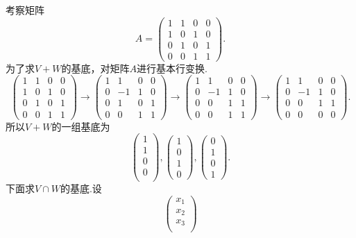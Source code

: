 ﻿\documentclass{book} \usepackage{exsheets} \usepackage{xeCJK}
\begin{document}
\begin{solution}
  考察矩阵
$$
A=
\begin{pmatrix}
  1&1&0&0\\
  1&0&1&0\\
  0&1&0&1\\
  0&0&1&1
\end{pmatrix}.
$$
为了求$V+W$的基底，对矩阵$A$进行基本行变换.
$$
  \begin{pmatrix}
    1&1&0&0\\
    1&0&1&0\\
    0&1&0&1\\
    0&0&1&1
  \end{pmatrix}\to
  \begin{pmatrix}
    1&1&0&0\\
    0&-1&1&0\\
    0&1&0&1\\
    0&0&1&1
  \end{pmatrix}\to
  \begin{pmatrix}
    1&1&0&0\\
    0&-1&1&0\\
    0&0&1&1\\
    0&0&1&1
  \end{pmatrix}\to
  \begin{pmatrix}
    1&1&0&0\\
    0&-1&1&0\\
    0&0&1&1\\
    0&0&0&0
  \end{pmatrix}.
$$
所以$V+W$的一组基底为
$$
\begin{pmatrix}
  1\\
  1\\
  0\\
  0\\
\end{pmatrix},
\begin{pmatrix}
  1\\
  0\\
  1\\
  0
\end{pmatrix},
\begin{pmatrix}
  0\\
  1\\
  0\\
  1
\end{pmatrix}.
$$
下面求$V\cap W$的基底.设
$$
\begin{pmatrix}
  x_1\\
  x_2\\
  x_3\\

\end{pmatrix}$$
\end{solution}
\end{document}

